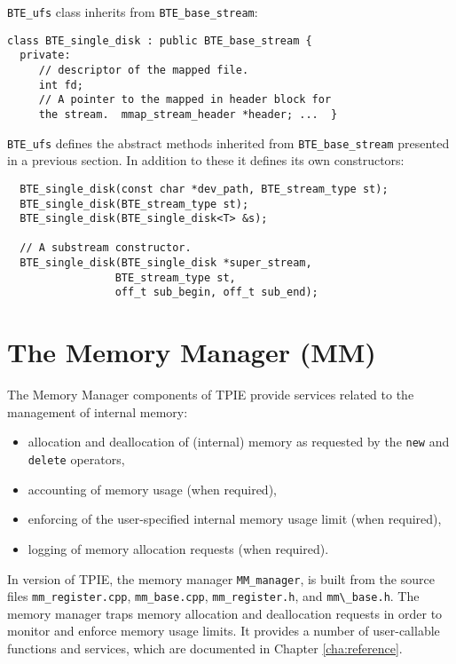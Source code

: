 \verb|BTE_ufs| class inherits from \verb|BTE_base_stream|:
\begin{verbatim}
class BTE_single_disk : public BTE_base_stream { 
  private:
     // descriptor of the mapped file.  
     int fd;
     // A pointer to the mapped in header block for
     the stream.  mmap_stream_header *header; ...  }
\end{verbatim}

\verb|BTE_ufs| defines the abstract methods inherited from
\verb|BTE_base_stream| presented in a previous section. In addition to
these it defines its own constructors:
\begin{verbatim}
  BTE_single_disk(const char *dev_path, BTE_stream_type st); 
  BTE_single_disk(BTE_stream_type st); 
  BTE_single_disk(BTE_single_disk<T> &s); 
  
  // A substream constructor.
  BTE_single_disk(BTE_single_disk *super_stream,
                 BTE_stream_type st,
                 off_t sub_begin, off_t sub_end);
\end{verbatim}


\section{The Memory Manager (MM)}
\label{sec:ref-mm}

The Memory Manager components of TPIE provide services related to
the management of internal memory:
\begin{itemize}
\item allocation and deallocation of (internal)
memory as requested by the \verb|new| and \verb|delete| operators,
\item accounting of memory usage (when required),
\item enforcing of the user-specified internal memory usage
limit (when required),
\item logging of memory allocation requests (when required).
\end{itemize}

In version \version of TPIE, the memory manager
\verb|MM_manager|, is built from the source files
\verb|mm_register.cpp|, \verb|mm_base.cpp|,
\verb|mm_register.h|, and \verb|mm\_base.h|.  The memory
manager traps memory allocation and deallocation requests in
order to monitor and enforce memory usage limits. It
provides a number of user-callable functions and services,
which are documented in Chapter \ref{cha:reference}.

